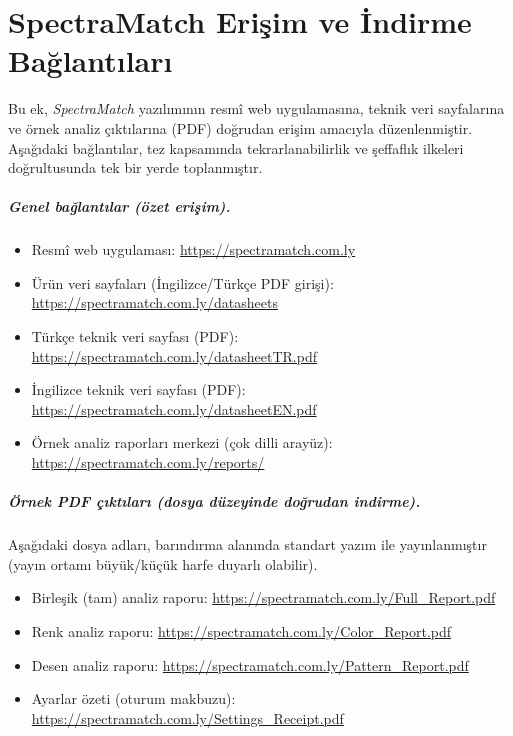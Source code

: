 
\chapter{SpectraMatch Erişim ve İndirme Bağlantıları}
\label{app:spectramatch-erisim}

\noindent Bu ek, \textit{SpectraMatch} yazılımının resmî web uygulamasına, teknik veri sayfalarına ve örnek analiz çıktılarına (PDF) doğrudan erişim amacıyla düzenlenmiştir. Aşağıdaki bağlantılar, tez kapsamında tekrarlanabilirlik ve şeffaflık ilkeleri doğrultusunda tek bir yerde toplanmıştır.

\paragraph*{Genel bağlantılar (özet erişim).}
\begin{itemize}
  \item Resmî web uygulaması: \url{https://spectramatch.com.ly}
  \item Ürün veri sayfaları (İngilizce/Türkçe PDF girişi): \url{https://spectramatch.com.ly/datasheets}
  \item Türkçe teknik veri sayfası (PDF): \url{https://spectramatch.com.ly/datasheetTR.pdf}
  \item İngilizce teknik veri sayfası (PDF): \url{https://spectramatch.com.ly/datasheetEN.pdf}
  \item Örnek analiz raporları merkezi (çok dilli arayüz): \url{https://spectramatch.com.ly/reports/}
\end{itemize}

\paragraph*{Örnek PDF çıktıları (dosya düzeyinde doğrudan indirme).}
Aşağıdaki dosya adları, barındırma alanında standart yazım ile yayınlanmıştır (yayın ortamı büyük/küçük harfe duyarlı olabilir).
\begin{itemize}
  \item Birleşik (tam) analiz raporu: \url{https://spectramatch.com.ly/Full_Report.pdf}
  \item Renk analiz raporu: \url{https://spectramatch.com.ly/Color_Report.pdf}
  \item Desen analiz raporu: \url{https://spectramatch.com.ly/Pattern_Report.pdf}
  \item Ayarlar özeti (oturum makbuzu): \url{https://spectramatch.com.ly/Settings_Receipt.pdf}
\end{itemize}

